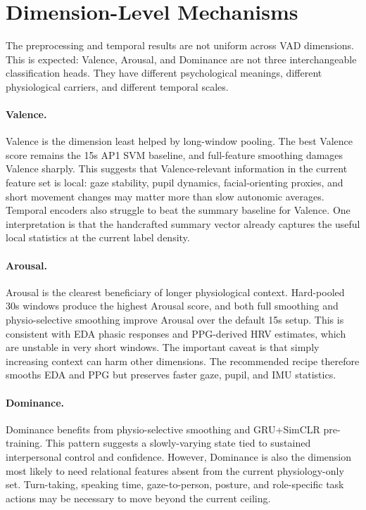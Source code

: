 \documentclass[sigconf,review,anonymous]{acmart}
\begin{document}
\section{Dimension-Level Mechanisms}
\label{sec:dimension_mechanisms}

The preprocessing and temporal results are not uniform across VAD dimensions.
This is expected: Valence, Arousal, and Dominance are not three interchangeable
classification heads.
They have different psychological meanings, different physiological carriers,
and different temporal scales.

\paragraph{Valence.}
Valence is the dimension least helped by long-window pooling.
The best Valence score remains the 15s AP1 SVM baseline, and full-feature
smoothing damages Valence sharply.
This suggests that Valence-relevant information in the current feature set is
local: gaze stability, pupil dynamics, facial-orienting proxies, and short
movement changes may matter more than slow autonomic averages.
Temporal encoders also struggle to beat the summary baseline for Valence.
One interpretation is that the handcrafted summary vector already captures the
useful local statistics at the current label density.

\paragraph{Arousal.}
Arousal is the clearest beneficiary of longer physiological context.
Hard-pooled 30s windows produce the highest Arousal score, and both full
smoothing and physio-selective smoothing improve Arousal over the default 15s
setup.
This is consistent with EDA phasic responses and PPG-derived HRV estimates,
which are unstable in very short windows.
The important caveat is that simply increasing context can harm other
dimensions.
The recommended recipe therefore smooths EDA and PPG but preserves faster
gaze, pupil, and IMU statistics.

\paragraph{Dominance.}
Dominance benefits from physio-selective smoothing and GRU+SimCLR pre-training.
This pattern suggests a slowly-varying state tied to sustained interpersonal
control and confidence.
However, Dominance is also the dimension most likely to need relational
features absent from the current physiology-only set.
Turn-taking, speaking time, gaze-to-person, posture, and role-specific task
actions may be necessary to move beyond the current ceiling.
\end{document}
